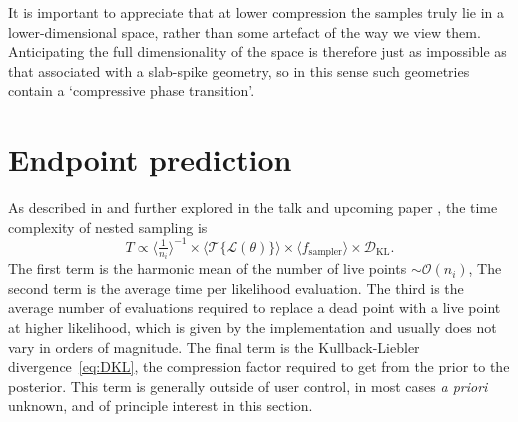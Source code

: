 \documentclass[usenatbib]{mnras}
\newcommand{\nlive}{n_i}
\newcommand{\Like}{\mathcal{L}}
\newcommand{\DKL}{\mathcal{D}_\mathrm{KL}}
\begin{document}
\par
It is important to appreciate that at lower compression the samples truly lie in a lower-dimensional space, rather than some artefact of the way we view them. Anticipating the full dimensionality of the space is therefore just as impossible as that associated with a slab-spike geometry, so in this sense such geometries contain a `compressive phase transition'. 

\section{Endpoint prediction}\label{sec:endpoint}
As described in \citet{supernest} and further explored in the talk and upcoming paper \citet{kcl_talk, scaling_frontier}, the time complexity of nested sampling is
\begin{equation}
    T \propto \langle \tfrac{1}{\nlive} \rangle^{-1} \times \langle \mathcal{T}\{ \Like(\theta) \} \rangle \times \langle f_\mathrm{sampler} \rangle \times \DKL.
\end{equation}
The first term is the harmonic mean of the number of live points $\sim\mathcal{O}(n_i)$, The second term is the average time per likelihood evaluation. The third is the average number of evaluations required to replace a dead point with a live point at higher likelihood, which is given by the implementation and usually does not vary in orders of magnitude. 
The final term is the Kullback-Liebler divergence~\cref{eq:DKL}, the compression factor required to get from the prior to the posterior. This term is generally outside of user control, in most cases \textit{a priori} unknown, and of principle interest in this section.
\end{document}

